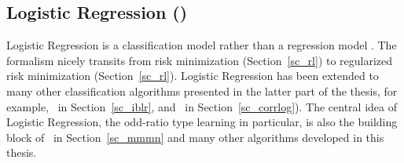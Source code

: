 {\fi




%
% 
\subsection{Logistic Regression (\lr)}\label{sc_lr}

Logistic Regression is a classification model rather than a regression model \citep{Bishop07}.
The formalism nicely transits from risk minimization (Section~\ref{sc_rl}) to regularized risk minimization (Section~\ref{sc_rl}).
Logistic Regression has been extended to many other classification algorithms presented in the latter part of the thesis, for example, \iblr\ in Section~\ref{sc_iblr}, and \corrlog\ in Section~\ref{sc_corrlog}).
The central idea of Logistic Regression, the odd-ratio type learning in particular, is also the building block of \mmmn\ in Section~\ref{sc_mmmn} and many other algorithms developed in this thesis.

}

